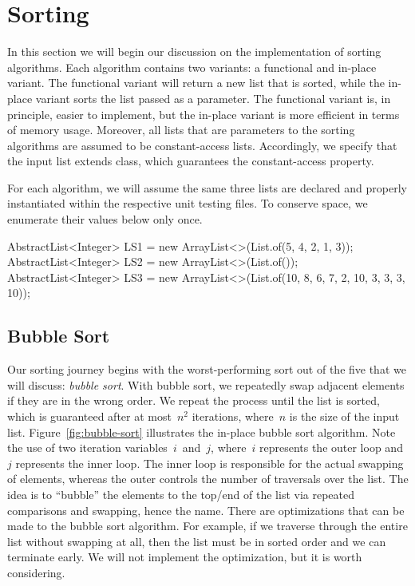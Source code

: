 \section{Sorting}
In this section we will begin our discussion on the implementation of sorting algorithms. Each algorithm contains two variants: a functional and in-place variant. 
The functional variant will return a new list that is sorted, while the in-place variant sorts the list passed as a parameter. 
The functional variant is, in principle, easier to implement, but the in-place variant is more efficient in terms of memory usage. 
Moreover, all lists that are parameters to the sorting algorithms are assumed to be constant-access lists. 
Accordingly, we specify that the input list extends  class, which guarantees the constant-access property.

For each algorithm, we will assume the same three lists are declared and properly instantiated within the respective unit testing files. 
To conserve space, we enumerate their values below only once.

\begin{verbnobox}[\small]
AbstractList<Integer> LS1 = new ArrayList<>(List.of(5, 4, 2, 1, 3));
AbstractList<Integer> LS2 = new ArrayList<>(List.of());
AbstractList<Integer> LS3 = new ArrayList<>(List.of(10, 8, 6, 7, 2, 10, 3, 3, 3, 10));
\end{verbnobox}

\subsection{Bubble Sort}
Our sorting journey begins with the worst-performing sort out of the five that we will discuss: \emph{bubble sort}. 
With bubble sort, we repeatedly swap adjacent elements if they are in the wrong order. 
We repeat the process until the list is sorted, which is guaranteed after at most~$n^2$ iterations, where~$n$ is the size of the input list. 
Figure~\ref{fig:bubble-sort} illustrates the in-place bubble sort algorithm. 
Note the use of two iteration variables~$i$~and~$j$, where~$i$ represents the outer loop and~$j$ represents the inner loop. 
The inner loop is responsible for the actual swapping of elements, whereas the outer controls the number of traversals over the list. 
The idea is to ``bubble'' the elements to the top/end of the list via repeated comparisons and swapping, hence the name. 
There are optimizations that can be made to the bubble sort algorithm. 
For example, if we traverse through the entire list without swapping at all, then the list must be in sorted order and we can terminate early. 
We will not implement the optimization, but it is worth considering.

